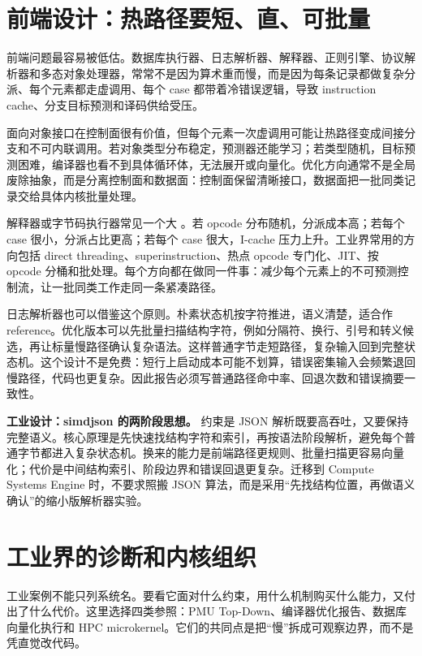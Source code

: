 \section{前端设计：热路径要短、直、可批量}

前端问题最容易被低估。数据库执行器、日志解析器、解释器、正则引擎、协议解析器和多态对象处理器，常常不是因为算术重而慢，而是因为每条记录都做复杂分派、每个元素都走虚调用、每个 case 都带着冷错误逻辑，导致 instruction cache、分支目标预测和译码供给受压。

面向对象接口在控制面很有价值，但每个元素一次虚调用可能让热路径变成间接分支和不可内联调用。若对象类型分布稳定，预测器还能学习；若类型随机，目标预测困难，编译器也看不到具体循环体，无法展开或向量化。优化方向通常不是全局废除抽象，而是分离控制面和数据面：控制面保留清晰接口，数据面把一批同类记录交给具体内核批量处理。

解释器或字节码执行器常见一个大 。若 opcode 分布随机，分派成本高；若每个 case 很小，分派占比更高；若每个 case 很大，I-cache 压力上升。工业界常用的方向包括 direct threading、superinstruction、热点 opcode 专门化、JIT、按 opcode 分桶和批处理。每个方向都在做同一件事：减少每个元素上的不可预测控制流，让一批同类工作走同一条紧凑路径。

日志解析器也可以借鉴这个原则。朴素状态机按字符推进，语义清楚，适合作 reference。优化版本可以先批量扫描结构字符，例如分隔符、换行、引号和转义候选，再让标量慢路径确认复杂语法。这样普通字节走短路径，复杂输入回到完整状态机。这个设计不是免费：短行上启动成本可能不划算，错误密集输入会频繁退回慢路径，代码也更复杂。因此报告必须写普通路径命中率、回退次数和错误摘要一致性。

\begin{casebox}
\textbf{工业设计：simdjson 的两阶段思想。}
约束是 JSON 解析既要高吞吐，又要保持完整语义。核心原理是先快速找结构字符和索引，再按语法阶段解析，避免每个普通字节都进入复杂状态机。换来的能力是前端路径更规则、批量扫描更容易向量化；代价是中间结构索引、阶段边界和错误回退更复杂。迁移到 Compute Systems Engine 时，不要求照搬 JSON 算法，而是采用“先找结构位置，再做语义确认”的缩小版解析器实验。
\end{casebox}

\section{工业界的诊断和内核组织}

工业案例不能只列系统名。要看它面对什么约束，用什么机制购买什么能力，又付出了什么代价。这里选择四类参照：PMU Top-Down、编译器优化报告、数据库向量化执行和 HPC microkernel。它们的共同点是把“慢”拆成可观察边界，而不是凭直觉改代码。

